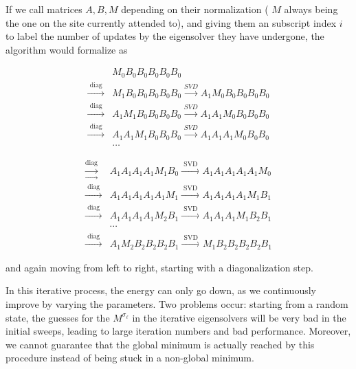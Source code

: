 \documentclass[12pt]{article}
\begin{document}
If we call matrices $A, B, M$ depending on their normalization ( $M$ always being the one on the site currently attended to), and giving them an subscript index $i$ to label the number of updates by the eigensolver they have undergone, the algorithm would formalize as

$$
\begin{array}{ll} 
& M_{0} B_{0} B_{0} B_{0} B_{0} B_{0} \\
\xrightarrow{\text { diag }} & M_{1} B_{0} B_{0} B_{0} B_{0} B_{0} \xrightarrow{S V D} A_{1} M_{0} B_{0} B_{0} B_{0} B_{0} \\
\xrightarrow{\text { diag }} & A_{1} M_{1} B_{0} B_{0} B_{0} B_{0} \xrightarrow{S V D} A_{1} A_{1} M_{0} B_{0} B_{0} B_{0} \\
\xrightarrow{\text { diag }} & A_{1} A_{1} M_{1} B_{0} B_{0} B_{0} \xrightarrow{S V D} A_{1} A_{1} A_{1} M_{0} B_{0} B_{0} \\
& \ldots
\end{array}
$$

$$
\begin{array}{ll}
\xrightarrow[\rightarrow]{\operatorname{diag}} & A_{1} A_{1} A_{1} A_{1} M_{1} B_{0} \xrightarrow{\text { SVD }} A_{1} A_{1} A_{1} A_{1} A_{1} M_{0} \\
\xrightarrow{\text { diag }} & A_{1} A_{1} A_{1} A_{1} A_{1} M_{1} \xrightarrow{\text { SVD }} A_{1} A_{1} A_{1} A_{1} M_{1} B_{1} \\
\xrightarrow{\text { diag }} & A_{1} A_{1} A_{1} A_{1} M_{2} B_{1} \xrightarrow{\text { SVD }} A_{1} A_{1} A_{1} M_{1} B_{2} B_{1} \\
& \cdots \\
\xrightarrow{\text { diag }} & A_{1} M_{2} B_{2} B_{2} B_{2} B_{1} \xrightarrow{\text { SVD }} M_{1} B_{2} B_{2} B_{2} B_{2} B_{1}
\end{array}
$$

and again moving from left to right, starting with a diagonalization step.

In this iterative process, the energy can only go down, as we continuously improve by varying the parameters. Two problems occur: starting from a random state, the guesses for the $M^{\sigma_{\ell}}$ in the iterative eigensolvers will be very bad in the initial sweeps, leading to large iteration numbers and bad performance. Moreover, we cannot guarantee that the global minimum is actually reached by this procedure instead of being stuck in a non-global minimum.
\end{document}
